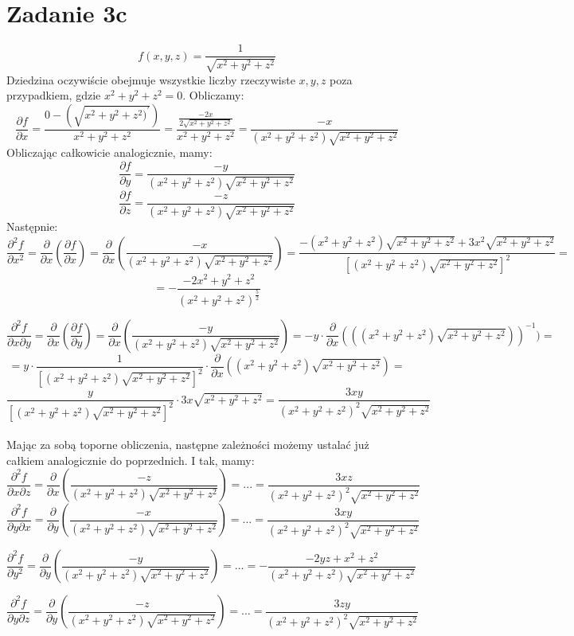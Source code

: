 \documentclass{article}
\begin{document}
\section*{Zadanie 3c}
$$f(x,y,z) = \frac{1}{\sqrt{x^2+y^2+z^2}}$$
Dziedzina oczywiście obejmuje wszystkie liczby rzeczywiste $x,y,z$ poza przypadkiem, gdzie $x^2 + y^2 +z^2 = 0$. Obliczamy: \\
$$\frac{\partial f}{\partial x} = \frac{0-(\sqrt{x^2+y^2+z^2)^{'}})}{x^2+y^2+z^2}= \frac{\frac{-2x}{2\sqrt{x^2+y^2+z^2}}}{x^2+y^2+z^2} = \frac{-x}{(x^2+y^2+z^2)\sqrt{x^2+y^2+z^2}}$$
Obliczając całkowicie analogicznie, mamy:
$$\frac{\partial f}{\partial y} = \frac{-y}{(x^2+y^2+z^2)\sqrt{x^2+y^2+z^2}}$$
$$\frac{\partial f}{\partial z} = \frac{-z}{(x^2+y^2+z^2)\sqrt{x^2+y^2+z^2}}$$
Następnie:
$$\frac{\partial^{2}f}{\partial x^2} = \frac{\partial}{\partial x} (\frac{\partial f}{\partial x}) = \frac{\partial}{\partial x}(\frac{-x}{(x^2+y^2+z^2)\sqrt{x^2+y^2+z^2}}) = \frac{-(x^2+y^2+z^2)\sqrt{x^2+y^2+z^2}+3x^2 \sqrt{x^2+y^2+z^2}}{[(x^2+y^2+z^2)\sqrt{x^2+y^2+z^2}]^2} = $$
$$= - \frac{-2x^2+y^2+z^2}{(x^2+y^2+z^2)^{\frac{5}{2}}}$$

$$\frac{\partial^{2}f}{\partial x \partial y} = \frac{\partial}{\partial x}(\frac{\partial f}{\partial y}) = \frac{\partial}{\partial x} (\frac{-y}{(x^2+y^2+z^2)\sqrt{x^2+y^2+z^2}}) = -y \cdot \frac{\partial}{\partial x} (((x^2+y^2+z^2)\sqrt{x^2+y^2+z^2}))^{-1}) = $$
$$= y \cdot \frac{1}{[(x^2+y^2+z^2)\sqrt{x^2+y^2+z^2}]^2}\cdot \frac{\partial}{\partial x} ((x^2+y^2+z^2)\sqrt{x^2+y^2+z^2}) = $$ $$\frac{y}{[(x^2+y^2+z^2)\sqrt{x^2+y^2+z^2}]^2}\cdot 3x\sqrt{x^2+y^2+z^2} = \frac{3xy}{(x^2+y^2+z^2)^2\sqrt{x^2+y^2+z^2}}$$ \\
Mając za sobą toporne obliczenia, następne zależności możemy ustalać już całkiem analogicznie do poprzednich. I tak, mamy:
$$\frac{\partial^{2}f}{\partial x \partial z} = \frac{\partial}{\partial x}(\frac{-z}{(x^2+y^2+z^2)\sqrt{x^2+y^2+z^2}}) = ... = \frac{3xz}{(x^2+y^2+z^2)^2 \sqrt{x^2+y^2+z^2}}$$
$$\frac{\partial^{2}f}{\partial y \partial x} = \frac{\partial}{\partial y}(\frac{-x}{(x^2+y^2+z^2)\sqrt{x^2+y^2+z^2}}) = ... = \frac{3xy}{(x^2+y^2+z^2)^2\sqrt{x^2+y^2+z^2}}$$

$$\frac{\partial^{2}f}{\partial y^2} = \frac{\partial}{\partial y}(\frac{-y}{(x^2+y^2+z^2)\sqrt{x^2+y^2+z^2}}) = ... = - \frac{-2yz+x^2+z^2}{(x^2+y^2+z^2)\sqrt{x^2+y^2+z^2}}$$

$$\frac{\partial^{2}f}{\partial y \partial z} = \frac{\partial}{\partial y}(\frac{-z}{(x^2+y^2+z^2)\sqrt{x^2+y^2+z^2}}) = ... = \frac{3zy}{(x^2+y^2+z^2)^2\sqrt{x^2+y^2+z^2}}$$
\end{document}
